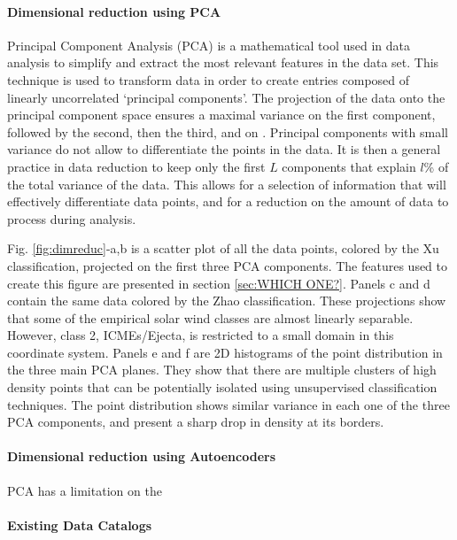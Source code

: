\paragraph{Dimensional reduction using PCA}
Principal Component Analysis (PCA) is a mathematical tool used in data analysis to simplify and extract the most relevant features in the data set. This technique is used to transform data in order to create entries composed of linearly uncorrelated `principal components'. The projection of the data onto the principal component space ensures a maximal variance on the first component, followed by the second, then the third, and on \citep{Shlens2014}. Principal components with small variance do not allow to differentiate the points in the data. It is then a general practice in data reduction to keep only the first $L$ components that explain $l$\% of the total variance of the data. This allows for a selection of information that will effectively differentiate data points, and for a reduction on the amount of data to process during analysis.

Fig. \ref{fig:dimreduc}-a,b is a scatter plot of all the data points, colored by the Xu classification, projected on the first three PCA components. The features used to create this figure are presented in section \ref{sec:WHICH ONE?}. Panels c and d contain the same data colored by the Zhao classification. These projections show that some of the empirical solar wind classes are almost linearly separable. However, class 2, ICMEs/Ejecta, is restricted to a small domain in this coordinate system. Panels e and f are 2D histograms of the point distribution in the three main PCA planes. They show that there are multiple clusters of high density points that can be potentially isolated using unsupervised classification techniques. The point distribution shows similar variance in each one of the three PCA components, and present a sharp drop in density at its borders.

\paragraph{Dimensional reduction using Autoencoders}
PCA has a limitation on the 

\paragraph{Existing Data Catalogs}